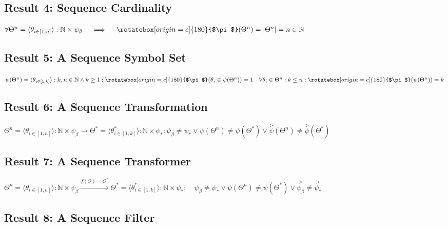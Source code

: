 \documentclass[acmtoplas]{acmart}
\newcommand{\invpi}[1]{\mathop{\rotatebox[origin=c]{180}{$\pi$}}#1}
\begin{document}
\subsection{Result 4: Sequence Cardinality\cite{adtpaper}\cite{Lutalo2024gtnc}}
\label{RES4}

$\forall \Theta^n = \langle \theta_{i \in [1,n]} \rangle : \mathbb{N} \times \psi_\beta \quad \implies \quad \invpi(\Theta^n) = |\Theta^n| = n \in \mathbb{N}$ 



\subsection{Result 5: A Sequence Symbol Set\cite{ossipaper}\cite{Lutalo2024gtnc}}
\label{RES5}

$\psi(\Theta^n) = \langle \theta_{i \in [1,k]} \rangle : k,n \in \mathbb{N} \land k \geq 1 : \invpi(\theta_i \in \psi(\Theta^n)) = 1 \quad \forall \theta_i \in \Theta^n : k \leq n : \invpi(\psi(\Theta^n)) = k$


\subsection{Result 6: A Sequence Transformation\cite{transformatics}\cite{lnspaper}}

$\Theta^n = \langle \theta_{i \in [1,n]} \rangle : \mathbb{N} \times \psi_\beta \rightarrow \Theta^* = \langle \theta^*_{i \in [1,k]} \rangle : \mathbb{N} \times \psi_* : \psi_\beta \neq \psi_{*} \lor \psi(\Theta^n) \neq \psi(\Theta^*) \lor \overset{>}{\psi}(\Theta^n) \neq \overset{>}{\psi}(\Theta^*)$


\subsection{Result 7: A Sequence Transformer\cite{Lutalo2025transpsy}\cite{transformatics}}
\label{RES7}

$\Theta^n = \langle \theta_{i \in [1,n]} \rangle : \mathbb{N} \times \psi_\beta \xrightarrow{f(\Theta)=\Theta^*} \Theta^* = \langle \theta^*_{i \in [1,k]} \rangle: \mathbb{N} \times \psi_* 
; \quad \psi_\beta \neq \psi_{*} \lor \psi(\Theta^n) \neq \psi(\Theta^*) \lor \overset{>}{\psi_\beta} \neq \overset{>}{\psi_*}$

\subsection{Result 8: A Sequence Filter\cite{transformatics}}
\label{RES8}
\end{document}
